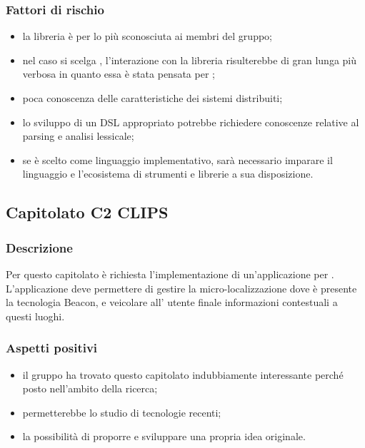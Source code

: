 \documentclass[12pt,a4paper]{article}
\begin{document}
\subsubsection{Fattori di rischio}
\begin{itemize}
\item la libreria  è per lo più sconosciuta ai membri del gruppo;
\item nel caso si scelga , l'interazione con la libreria  risulterebbe di gran lunga più verbosa in quanto essa è stata pensata per ;
\item poca conoscenza delle caratteristiche dei sistemi distribuiti;
\item lo sviluppo di un DSL appropriato potrebbe richiedere conoscenze relative al parsing e analisi lessicale;
\item se  è scelto come linguaggio implementativo, sarà necessario imparare il linguaggio e l'ecosistema di strumenti e librerie a sua disposizione.
\end{itemize}

\newpage

\subsection{Capitolato C2 CLIPS}

\subsubsection{Descrizione}

Per questo capitolato è richiesta l'implementazione di un'applicazione per . L'applicazione deve permettere di gestire la micro-localizzazione dove è presente la tecnologia  Beacon, e veicolare all' utente finale informazioni contestuali a questi luoghi. 

\subsubsection{Aspetti positivi}
\begin{itemize}
 \item il gruppo ha trovato questo capitolato indubbiamente interessante perché posto nell'ambito della ricerca;
 \item permetterebbe lo studio di tecnologie recenti;
 \item la possibilità di proporre e sviluppare una propria idea originale.
\end{itemize}
\end{document}
